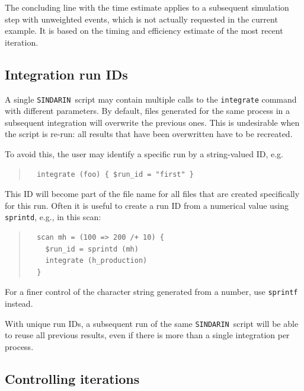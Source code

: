 \documentclass[12pt]{book}
\newcommand{\ttt}[1]{\texttt{#1}}
\newcommand{\sindarin}{\texttt{SINDARIN}}
\begin{document}
The concluding line with the time estimate applies to a subsequent simulation
step with unweighted events, which is not actually requested in the current
example.  It is based on the timing and efficiency estimate of the most recent
iteration.


\subsection{Integration run IDs}

A single \sindarin\ script may contain multiple calls to the
\ttt{integrate} command with different parameters.  By default,
files generated for the same process in a subsequent integration will
overwrite the previous ones.  This is undesirable when the script is
re-run: all results that have been overwritten have to be recreated.

To avoid this, the user may identify a specific run by a string-valued
ID, e.g.
\begin{quote}
\begin{footnotesize}
\begin{verbatim}
  integrate (foo) { $run_id = "first" }
\end{verbatim}
\end{footnotesize}
\end{quote}
This ID will become part of the file name for all files that are
created specifically for this run.  Often it is useful to create a run
ID from a numerical value using \ttt{sprintd}, e.g., in this scan:
\begin{quote}
\begin{footnotesize}
\begin{verbatim}
  scan mh = (100 => 200 /+ 10) {
    $run_id = sprintd (mh)
    integrate (h_production)
  }
\end{verbatim}
\end{footnotesize}
\end{quote}
For a finer control of the character string generated from a number,
use \ttt{sprintf} instead.

With unique run IDs, a subsequent run of the same \sindarin\ script
will be able to reuse all previous results, even if there is more than
a single integration per process.




\subsection{Controlling iterations}
\end{document}
